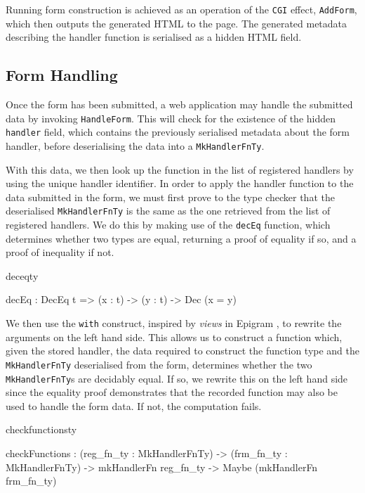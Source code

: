 Running form construction is achieved as an operation of the \texttt{CGI}
effect, \texttt{AddForm}, which then outputs the generated HTML to the page.
The generated metadata describing the handler function is serialised as a
hidden HTML field.

\subsection{Form Handling}
\label{formhandling}
Once the form has been submitted, a web application may handle the submitted
data by invoking \texttt{HandleForm}. This will check for the
existence of the hidden \texttt{handler} field, which contains the previously
serialised metadata about the form handler, before deserialising the
data into a \texttt{MkHandlerFnTy}. 

With this data, we then look up the function in the list of registered
handlers by using the unique handler identifier. In order to apply
the handler function to the data submitted in the form, we must first prove to
the type checker that the deserialised \texttt{MkHandlerFnTy} is the same as
the one retrieved from the list of registered handlers. We do this by making
use of the \texttt{decEq} function, which determines whether two types are
equal, returning a proof of equality if so, and a proof of inequality if not.

\begin{SaveVerbatim}{deceqty}

decEq : DecEq t => (x : t) -> (y : t) -> Dec (x = y)

\end{SaveVerbatim}

We then use the \texttt{with} construct, inspired by
\textit{views} in Epigram \cite{mcbride.mckinna:viewfromleft}, to rewrite the
arguments on the left hand side. This allows us to construct a function which,
given the stored handler, the data required to
construct the function type and the \texttt{MkHandlerFnTy} deserialised from
the form, determines whether the two \texttt{MkHandlerFnTy}s are decidably
equal. If so, we rewrite this on the left hand side since the equality proof
demonstrates that the recorded function may also be used to handle the form
data. If not, the computation fails.

\begin{SaveVerbatim}{checkfunctionsty}

checkFunctions : (reg_fn_ty : MkHandlerFnTy) -> 
                 (frm_fn_ty : MkHandlerFnTy) -> 
                 mkHandlerFn reg_fn_ty -> 
                 Maybe (mkHandlerFn frm_fn_ty)
\end{SaveVerbatim}

